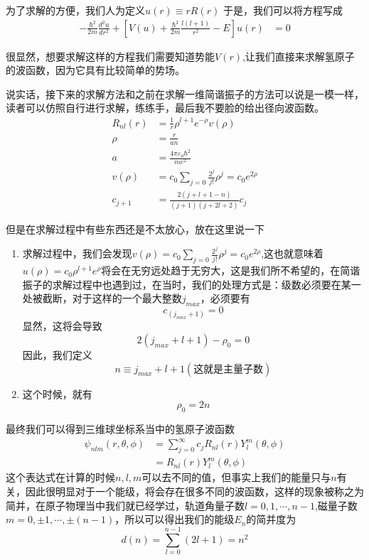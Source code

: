 \documentclass{article}
\begin{document}
为了求解的方便，我们人为定义$u(r)\equiv rR(r)$
于是，我们可以将方程写成
\begin{align*}
    -\frac{\hbar^2}{2m}\frac{d^2u}{dr^2}+\left[V(u)+\frac{\hbar^2}{2m}\frac{l(l+1)}{r^2}-E\right]u(r)&=0
\end{align*}

很显然，想要求解这样的方程我们需要知道势能$V(r)$,让我们直接来求解氢原子的波函数，因为它具有比较简单的势场。

说实话，接下来的求解方法和之前在求解一维简谐振子的方法可以说是一模一样，读者可以仿照自行进行求解，练练手，最后我不要脸的给出径向波函数。
\begin{align*}
    R_{nl}(r)&=\frac{1}{r}\rho^{l+1}e^{-\rho}v(\rho)\\
    \rho&=\frac{r}{an}\\
    a&=\frac{4\pi\varepsilon_0\hbar^2}{me^2}\\
    v(\rho)&=c_0\sum_{j=0}\frac{2^j}{j!}\rho^{j}=c_0e^{2\rho}\\
    c_{j+1}&=\frac{2(j+l+1-n)}{(j+1)(j+2l+2)}c_{j}
\end{align*}

但是在求解过程中有些东西还是不太放心，放在这里说一下
\begin{enumerate}
    \item 求解过程中，我们会发现$v(\rho)=c_0\sum_{j=0}\frac{2^j}{j!}\rho^{j}=c_0e^{2\rho}$,这也就意味着$u(\rho)=c_0\rho^{l+1}e^\rho$将会在无穷远处趋于无穷大，这是我们所不希望的，在简谐振子的求解过程中也遇到过，在当时，我们的处理方式是：级数必须要在某一处被截断，对于这样的一个最大整数$j_{max}$，必须要有
    \begin{equation*}
        c_{(j_{max}+1)}=0
    \end{equation*}
    显然，这将会导致
    \begin{equation*}
        2(j_{max}+l+1)-\rho_0=0
    \end{equation*}
    因此，我们定义
    \begin{equation*}
        n\equiv j_{max}+l+1(\text{这就是主量子数})
    \end{equation*}
    \item 这个时候，就有
    \begin{equation*}
        \rho_0=2n
    \end{equation*}
\end{enumerate}

最终我们可以得到三维球坐标系当中的氢原子波函数
\begin{align*}
    \psi_{nlm}(r,\theta,\phi)&=\sum_{j=0}^{\infty}c_{j}R_{nl}(r)Y_{l}^m(\theta,\phi)\\
    &=R_{nl}(r)Y_{l}^{m}(\theta,\phi)
\end{align*}
这个表达式在计算的时候$n,l,m$可以去不同的值，但事实上我们的能量只与$n$有关，因此很明显对于一个能级，将会存在很多不同的波函数，这样的现象被称之为简并，在原子物理当中我们就已经学过，轨道角量子数$l=0,1,\cdots,n-1$,磁量子数$m=0,\pm 1,\cdots,\pm (n-1)$，所以可以得出我们的能级$E_n$的简并度为
\begin{equation*}
    d(n)=\sum_{l=0}^{n-1}(2l+1)=n^2
\end{equation*}
\end{document}
